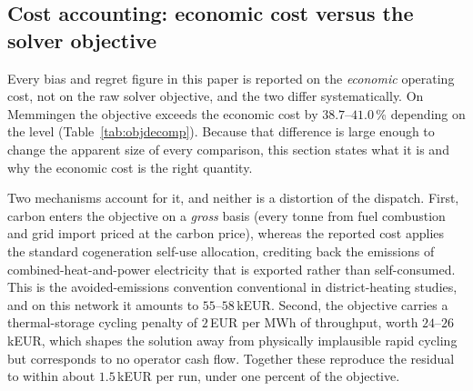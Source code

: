 
\subsection{Cost accounting: economic cost versus the solver objective}
\label{subsec:costacct}

Every bias and regret figure in this paper is reported on the \emph{economic} operating
cost, not on the raw solver objective, and the two differ systematically. On Memmingen the
objective exceeds the economic cost by $38.7$--$41.0$\,\% depending on the level
(Table~\ref{tab:objdecomp}). Because that difference is large enough to change the
apparent size of every comparison, this section states what it is and why the economic cost is the
right quantity.

Two mechanisms account for it, and neither is a distortion of the dispatch. First, carbon
enters the objective on a \emph{gross} basis (every tonne from fuel combustion and grid
import priced at the carbon price), whereas the reported cost applies the standard
cogeneration self-use allocation, crediting back the emissions of combined-heat-and-power
electricity that is exported rather than self-consumed. This is the avoided-emissions
convention conventional in district-heating studies, and on this network it amounts to
$55$--$58$\,kEUR. Second, the objective carries a thermal-storage cycling penalty of
$2$\,EUR per MWh of throughput, worth $24$--$26$\,kEUR, which shapes the solution away from
physically implausible rapid cycling but corresponds to no operator cash flow. Together
these reproduce the residual to within about $1.5$\,kEUR per run, under one percent of the
objective.


